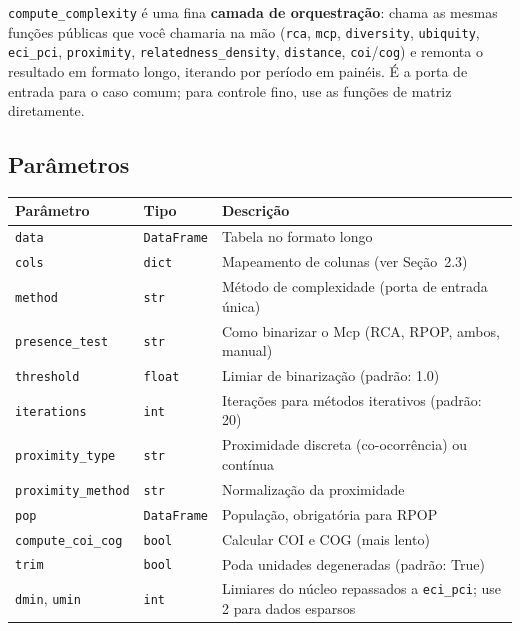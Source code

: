 \documentclass[12pt, a4paper]{article}
\newcommand{\fn}[1]{\texttt{#1}}
\begin{document}
\begin{notebox}
  \texttt{compute\_complexity} \'{e} uma fina \textbf{camada de
  orquestra\c{c}\~{a}o}: chama as mesmas fun\c{c}\~{o}es p\'{u}blicas que
  voc\^{e} chamaria na m\~{a}o (\fn{rca}, \fn{mcp}, \fn{diversity},
  \fn{ubiquity}, \fn{eci\_pci}, \fn{proximity}, \fn{relatedness\_density},
  \fn{distance}, \fn{coi}/\fn{cog}) e remonta o resultado em formato
  longo, iterando por per\'{i}odo em pain\'{e}is. \'{E} a porta de entrada
  para o caso comum; para controle fino, use as fun\c{c}\~{o}es de matriz
  diretamente.
\end{notebox}

\subsection{Par\^{a}metros}

\begin{center}
\renewcommand{\arraystretch}{1.3}
\begin{tabular}{llp{7cm}}
\toprule
\textbf{Par\^{a}metro} & \textbf{Tipo} & \textbf{Descri\c{c}\~{a}o} \\
\midrule
\texttt{data}            & \texttt{DataFrame} & Tabela no formato longo \\
\texttt{cols}            & \texttt{dict}      & Mapeamento de colunas (ver Se\c{c}\~{a}o~2.3) \\
\texttt{method}          & \texttt{str}       & M\'{e}todo de complexidade (porta de entrada \'{u}nica) \\
\texttt{presence\_test}  & \texttt{str}       & Como binarizar o Mcp (RCA, RPOP, ambos, manual) \\
\texttt{threshold}       & \texttt{float}     & Limiar de binariza\c{c}\~{a}o (padr\~{a}o: 1.0) \\
\texttt{iterations}      & \texttt{int}       & Itera\c{c}\~{o}es para m\'{e}todos iterativos (padr\~{a}o: 20) \\
\texttt{proximity\_type} & \texttt{str}       & Proximidade discreta (co-ocorr\^{e}ncia) ou cont\'{i}nua \\
\texttt{proximity\_method} & \texttt{str}     & Normaliza\c{c}\~{a}o da proximidade \\
\texttt{pop}             & \texttt{DataFrame} & Popula\c{c}\~{a}o, obrigat\'{o}ria para RPOP \\
\texttt{compute\_coi\_cog} & \texttt{bool}    & Calcular COI e COG (mais lento) \\
\texttt{trim}            & \texttt{bool}      & Poda unidades degeneradas (padr\~{a}o: True) \\
\texttt{dmin}, \texttt{umin} & \texttt{int}   & Limiares do n\'{u}cleo repassados a \fn{eci\_pci}; use 2 para dados esparsos \\
\bottomrule
\end{tabular}
\end{center}
\end{document}
